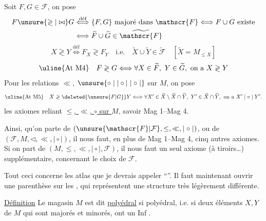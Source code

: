 
Soit $F,G\in\mathscr{F}$, on pose
\[
\begin{aligned}
F\unsure{\gtrless|\bowtie}G&\overset{\text{déf}}{\Longleftrightarrow}\{F,G\}\text{ majoré dans }\mathscr{F}\Longleftrightarrow F\cup G\text{ existe}\\
&\Longleftrightarrow\widetilde{F}\cup\widetilde{G}\in\widetilde{\mathscr{F}}
\end{aligned}
\]
\[
X\gtrless Y\overset{\text{déf}}{\Longleftrightarrow}F_X\gtrless F_Y\quad\text{i.e.}\quad\widetilde{X}\cup\widetilde{Y}\in\widetilde{\mathscr{F}}\quad[\widetilde{X}=M_{\leq X}]
\]
\[
\text{\uline{At M4}}\quad F\gtrless G\Longleftrightarrow\forall X\in\widetilde{F},\ Y\in\widetilde{G},\text{ on a }X\gtrless Y
\]
 Pour les relations  $\ll$, $\unsure{\circ\mid|\circ|\mid\circ\mid}$ sur $M$, on pose
\[
\text{\uline{At M5}}\quad X\gtrless\deleted{\unsure{F|G}}Y\Longleftrightarrow\forall X'\in\widetilde{X}\setminus\widetilde{X}\cap\widetilde{Y},\ Y'\in\widetilde{X}\cap\widetilde{Y},\text{ on a }X'\mid\circ\mid Y'.
\]
 les axiomes  reliant \uline{$\leq$, $\ll$, $\circ$ sur $M$}, savoir Mag 1--Mag 4.

Ainsi, qu'on parte de $(\unsure{\mathscr{F}|\mathcal{F}},\leq,\ll,\mid\circ\mid)$, ou de $(\mathscr{F},M,\triangleleft,\ll,\mid\circ\mid)$, il nous faut, en plus de Mag 1--Mag 4, cinq autres axiomes.
Si on part de $(M,\leq,\ll,\mid\circ\mid,\mathscr{F})$, il nous faut un seul axiome (à tiroirs\ldots) supplémentaire, concernant le choix de $\mathscr{F}$.

Tout ceci concerne les atlas que je devrais appeler ``''. Il faut maintenant ouvrir une parenthèse sur les , qui représentent une  structure très légèrement différente.

\uline{Définition} Le magasin $M$ est dit \uline{polyédral} si  polyédral, i.e. si deux éléments $X,Y$ de $M$ qui sont majorés et minorés, ont un Inf .


